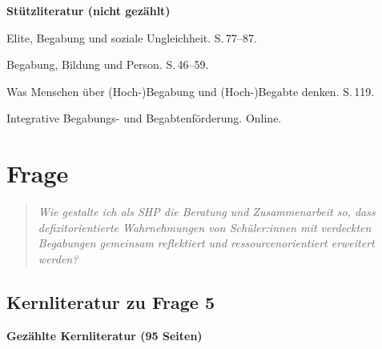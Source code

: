 \documentclass[ngerman, a4paper]{article}
\begin{document}
\textbf{Stützliteratur (nicht gezählt)}

\begin{litdesc}
  \item[\cite{horvath2021elite}] Elite, Begabung und soziale
    Ungleichheit. S.\,77--87.
  \item[\cite{weigand2021person}] Begabung, Bildung und Person.
    S.\,46--59.
  \item[\cite{baudson2021wasdenken}] Was Menschen über
    (Hoch-)Begabung und (Hoch-)Begabte denken. S.\,119.
  \item[\cite{dvs2025bbf}] Integrative Begabungs- und
    Begabtenförderung. Online.
\end{litdesc}
 



\section{Frage}
\label{sec:frage5}
 
\begin{quote}\itshape
Wie gestalte ich als SHP die Beratung und Zusammenarbeit so, 
dass defizitorientierte
Wahrnehmungen von Schüler:innen mit verdeckten Begabungen gemeinsam reflektiert
und ressourcenorientiert erweitert werden?
\end{quote}

\subsection{Kernliteratur zu Frage 5}
 
\textbf{Gezählte Kernliteratur (95 Seiten)}
\end{document}
